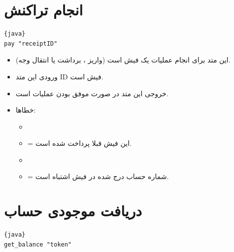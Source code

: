 \documentclass[]{article}
\begin{document}
\section*{{\titr انجام تراکنش}}

\begin{latin}

\begin{lstlisting}{java}
pay "receiptID"

\end{lstlisting}

\end{latin}

\begin{itemize}

\item
این متد برای انجام عملیات یک فیش است (واریز ، برداشت یا انتقال وجه).

\item
\textcolor{CustomColor}{ورودی} این متد ID فیش است.

\item
\textcolor{CustomColor}{خروجی} این متد در صورت موفق بودن عملیات  است.
\item
\textcolor{CustomColor}{خطاها}:
\begin{itemize}
\item
{} 
\item
{} = این فیش قبلا پرداخت شده است.

\item
{}
\item
{} = شماره حساب درج شده در فیش اشتباه است.


\end{itemize}



\end{itemize}


\section*{{\titr دریافت موجودی حساب}}

\begin{latin}

\begin{lstlisting}{java}
get_balance "token"

\end{lstlisting}

\end{latin}
\end{document}
